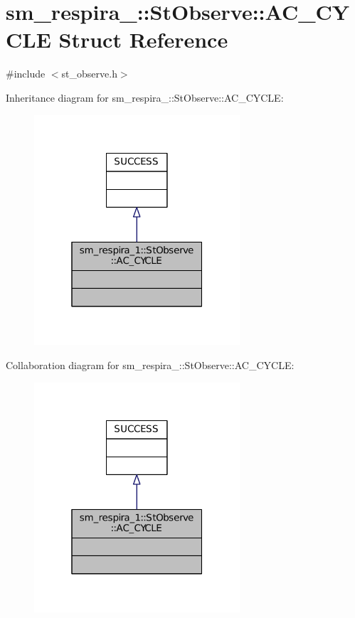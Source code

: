 \hypertarget{structsm__respira__1_1_1StObserve_1_1AC__CYCLE}{}\section{sm\+\_\+respira\+\_\+:\+:St\+Observe\+:\+:A\+C\+\_\+\+C\+Y\+C\+LE Struct Reference}
\label{structsm__respira__1_1_1StObserve_1_1AC__CYCLE}


{\ttfamily \#include $<$st\+\_\+observe.\+h$>$}



Inheritance diagram for sm\+\_\+respira\+\_\+:\+:St\+Observe\+:\+:A\+C\+\_\+\+C\+Y\+C\+LE\+:
\nopagebreak
\begin{figure}[H]
\begin{center}
\leavevmode
\includegraphics[width=217pt]{structsm__respira__1_1_1StObserve_1_1AC__CYCLE__inherit__graph}
\end{center}
\end{figure}


Collaboration diagram for sm\+\_\+respira\+\_\+:\+:St\+Observe\+:\+:A\+C\+\_\+\+C\+Y\+C\+LE\+:
\nopagebreak
\begin{figure}[H]
\begin{center}
\leavevmode
\includegraphics[width=217pt]{structsm__respira__1_1_1StObserve_1_1AC__CYCLE__coll__graph}
\end{center}
\end{figure}



